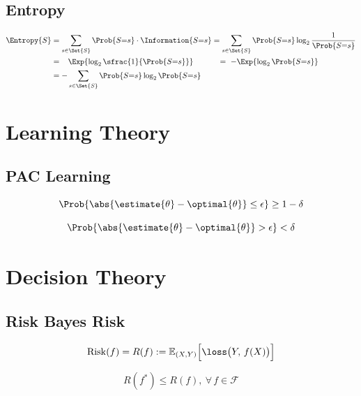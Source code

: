 \documentclass[18pt,a3paper,landscape, ncols=3]{cheatsheet}
\begin{document}
	\subsection{Entropy}
		\begin{mdframed}
			\begin{align*}
		    \Entropy{S} &= \sum_{s \in \Set{S}} \Prob{S{=}s} \cdot \Information{S{=}s} = \sum_{s \in \Set{S}} \Prob{S{=}s} \log_2 \frac{1}{\Prob{S{=}s}} \\
		                &=\quad\! \Exp{\log_2 \sfrac{1}{\Prob{S{=}s}}}\qquad\quad\, =\ {-} \Exp{\log_2 \Prob{S{=}s}} \\
		                &= {-} \sum_{s \in \Set{S}} \Prob{S{=}s} \log_2 \Prob{S{=}s}
		  \end{align*}
		\end{mdframed}

\section{Learning Theory} \seperator
	\subsection{PAC Learning}
		\begin{mdframed}
			\begin{minipage}{0.5\linewidth}%
				\[
					\Prob{\abs{\estimate{\theta} - \optimal{\theta}} \leq \epsilon} \geq 1 - \delta
				\]
			\end{minipage}%
			\vrule%
			\begin{minipage}{0.5\linewidth}%
				\[
					\Prob{\abs{\estimate{\theta} - \optimal{\theta}} > \epsilon} < \delta
				\]
			\end{minipage}
		\end{mdframed}

\section{Decision Theory} \seperator
	\subsection{Risk \qquad\qquad\qquad\qquad\qquad\qquad\qquad\qquad\quad Bayes Risk}
	\begin{mdframed}
		\begin{minipage}{0.5\linewidth}
			\[
				\mathrm{Risk}(f) = R(f) := \mathbb{E}_{(X,Y)} \Big[\loss \big(Y,\, f(X)\big)\Big]
			\]
		\end{minipage}%
		\qquad\vrule%
		\begin{minipage}{0.5\linewidth}
			\[
				R(f^*) \leq R(f),\ \forall\, f \in \mathcal{F}
			\]
		\end{minipage}
	\end{mdframed}
\end{document}
